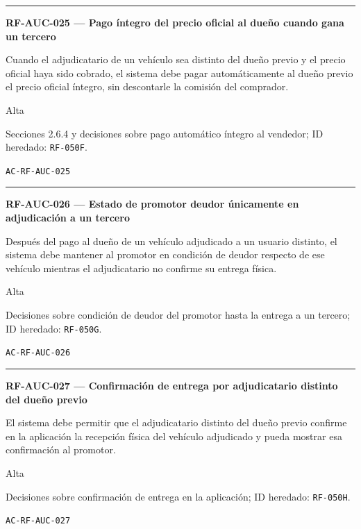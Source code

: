 \documentclass[10pt,letterpaper]{article}
\begin{document}
\vspace{0.25em}\hrule\vspace{0.65em}
\noindent\textbf{RF-AUC-025 --- Pago íntegro del precio oficial al dueño cuando gana un tercero}\par
\begin{description}[style=nextline,leftmargin=3.15cm,labelwidth=2.8cm,font=\normalfont\bfseries]
\item[Obligación] Cuando el adjudicatario de un vehículo sea distinto del dueño previo y el precio oficial haya sido cobrado, el sistema debe pagar automáticamente al dueño previo el precio oficial íntegro, sin descontarle la comisión del comprador.
\item[Prioridad] Alta
\item[Procedencia] Secciones 2.6.4 y decisiones sobre pago automático íntegro al vendedor; ID heredado: \texttt{RF-050F}.
\item[Verificación] \texttt{AC-RF-AUC-025}
\end{description}
\vspace{0.25em}\hrule\vspace{0.65em}
\noindent\textbf{RF-AUC-026 --- Estado de promotor deudor únicamente en adjudicación a un tercero}\par
\begin{description}[style=nextline,leftmargin=3.15cm,labelwidth=2.8cm,font=\normalfont\bfseries]
\item[Obligación] Después del pago al dueño de un vehículo adjudicado a un usuario distinto, el sistema debe mantener al promotor en condición de deudor respecto de ese vehículo mientras el adjudicatario no confirme su entrega física.
\item[Prioridad] Alta
\item[Procedencia] Decisiones sobre condición de deudor del promotor hasta la entrega a un tercero; ID heredado: \texttt{RF-050G}.
\item[Verificación] \texttt{AC-RF-AUC-026}
\end{description}
\vspace{0.25em}\hrule\vspace{0.65em}
\noindent\textbf{RF-AUC-027 --- Confirmación de entrega por adjudicatario distinto del dueño previo}\par
\begin{description}[style=nextline,leftmargin=3.15cm,labelwidth=2.8cm,font=\normalfont\bfseries]
\item[Obligación] El sistema debe permitir que el adjudicatario distinto del dueño previo confirme en la aplicación la recepción física del vehículo adjudicado y pueda mostrar esa confirmación al promotor.
\item[Prioridad] Alta
\item[Procedencia] Decisiones sobre confirmación de entrega en la aplicación; ID heredado: \texttt{RF-050H}.
\item[Verificación] \texttt{AC-RF-AUC-027}
\end{description}
\end{document}
